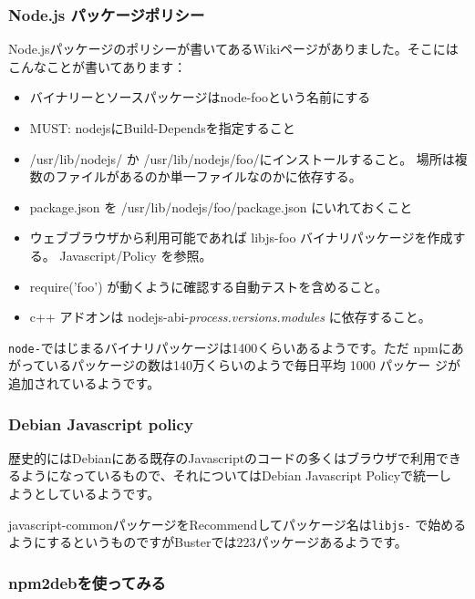 \documentclass[mingoth,a4paper]{jsarticle}
\begin{document}
\subsubsection{Node.js パッケージポリシー}

Node.jsパッケージのポリシーが書いてあるWikiページがありました\cite{debian-nodejs-manual}。そこにはこんなことが書いてあります：

\begin{itemize}
 \item バイナリーとソースパッケージはnode-fooという名前にする

 \item MUST: nodejsにBuild-Dependsを指定すること

 \item /usr/lib/nodejs/ か /usr/lib/nodejs/foo/にインストールすること。
	場所は複数のファイルがあるのか単一ファイルなのかに依存する。
 \item package.json を /usr/lib/nodejs/foo/package.json にいれておくこと

 \item ウェブブラウザから利用可能であれば libjs-foo バイナリパッケージを作成する。 Javascript/Policy を参照。

 \item require('foo') が動くように確認する自動テストを含めること。

 \item c++ アドオンは nodejs-abi-{\it process.versions.modules} に依存すること。

\end{itemize}


\texttt{node-}ではじまるバイナリパッケージは1400くらいあるようです。ただ
npmにあがっているパッケージの数は140万くらいのようで毎日平均 1000 パッケー
ジが追加されているようです。

\subsubsection{Debian Javascript policy}

歴史的にはDebianにある既存のJavascriptのコードの多くはブラウザで利用でき
るようになっているもので、それについてはDebian Javascript Policyで統一し
ようとしているようです\cite{debian-javascript-policy}。

javascript-commonパッケージをRecommendしてパッケージ名は\texttt{libjs-}
で始めるようにするというものですがBusterでは223パッケージあるようです。

\subsubsection{npm2debを使ってみる}
\end{document}
